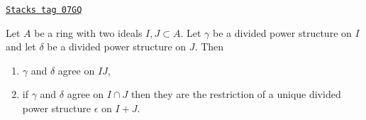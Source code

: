 \begin{lemma}
\label{dpa-lemma-two-ideals}
\href{https://stacks.math.columbia.edu/tag/07GQ}{\texttt{Stacks tag 07GQ}}

Let $A$ be a ring with two ideals $I, J \subset A$.
Let $\gamma$ be a divided power structure on $I$ and let
$\delta$ be a divided power structure on $J$.
Then
\begin{enumerate}
\item $\gamma$ and $\delta$ agree on $IJ$,
\item if $\gamma$ and $\delta$ agree on $I \cap J$ then they are
the restriction of a unique divided power structure $\epsilon$
on $I + J$.
\end{enumerate}
\end{lemma}

